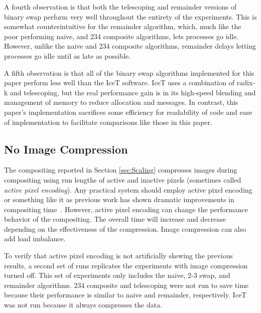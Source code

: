 \documentclass{vgtc}                          %
\newcommand*{\lcite}[1]{~\cite{#1}}
\newcommand*{\keyterm}[1]{\emph{#1}}
\newcommand{\textalgorithm}[1]{\textsf{#1}\xspace}
\newcommand{\binaryswap}{\textalgorithm{binary swap}}
\newcommand{\ttswap}{\textalgorithm{2-3 swap}}
\newcommand{\naive}{\textalgorithm{naive}}
\newcommand{\telescoping}{\textalgorithm{telescoping}}
\newcommand{\remainder}{\textalgorithm{remainder}}
\newcommand{\ttfcomposite}{\textalgorithm{234 composite}}
\newcommand{\Ttfcomposite}{\textalgorithm{234 composite}}
\newcommand{\radixk}{\textalgorithm{radix-k}}
\begin{document}
A fourth observation is that both the \telescoping and \remainder versions of binary swap perform very well throughout the entirety of the experiments.
This is somewhat counterintuitive for the \remainder algorithm, which, much like the poor performing \naive, and \ttfcomposite algorithms, lets processes go idle.
However, unlike the \naive and \ttfcomposite algorithms, \remainder delays letting processes go idle until as late as possible.

A fifth observation is that all of the \binaryswap algorithms implemented for this paper perform less well than the IceT software.
IceT uses a combination of \radixk and \telescoping, but the real performance gain is in its high-speed blending and management of memory to reduce allocation and messages.
In contrast, this paper's implementation sacrifices some efficiency for readability of code and ease of implementation to facilitate comparisons like those in this paper.

\subsection{No Image Compression}
\label{sec:FullImages}

The compositing reported in Section \ref{sec:Scaling} compresses images during compositing using run lengths of active and inactive pixels (sometimes called \keyterm{active pixel encoding}).
Any practical system should employ active pixel encoding or something like it as previous work has shown dramatic improvements in compositing time\lcite{Ahrens1998,Yang1999,Moreland2001,Takeuchi2003}.
However, active pixel encoding can change the performance behavior of the compositing.
The overall time will increase and decrease depending on the effectiveness of the compression.
Image compression can also add load imbalance.

To verify that active pixel encoding is not artificially skewing the previous results, a second set of runs replicates the experiments with image compression turned off.
This set of experiments only includes the \naive, \ttswap, and \remainder algorithms.
\Ttfcomposite and \telescoping were not run to save time because their performance is similar to \naive and \remainder, respectively.
IceT was not run because it always compresses the data.
\end{document}
